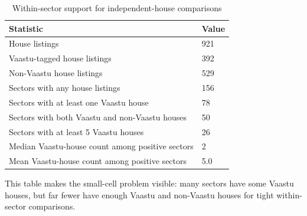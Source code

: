 \begin{table}[!htbp]
\centering
\caption{Within-sector support for independent-house comparisons}
\label{tab:house-support}
\begin{tabular}{ll}
\toprule
Statistic & Value \\
\midrule
House listings & 921 \\
Vaastu-tagged house listings & 392 \\
Non-Vaastu house listings & 529 \\
Sectors with any house listings & 156 \\
Sectors with at least one Vaastu house & 78 \\
Sectors with both Vaastu and non-Vaastu houses & 50 \\
Sectors with at least 5 Vaastu houses & 26 \\
Median Vaastu-house count among positive sectors & 2 \\
Mean Vaastu-house count among positive sectors & 5.0 \\
\bottomrule
\end{tabular}

\vspace{0.3em}
\par\begin{minipage}{0.95\linewidth}\footnotesize This table makes the small-cell problem visible: many sectors have some Vaastu houses, but far fewer have enough Vaastu and non-Vaastu houses for tight within-sector comparisons.\end{minipage}
\end{table}
